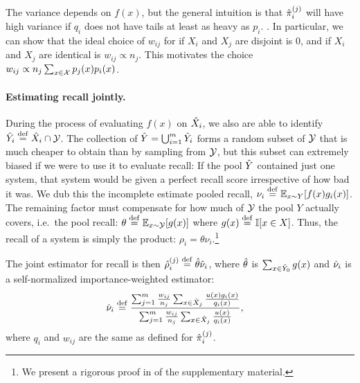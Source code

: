 The variance depends on $f(x)$, but the general intuition is that ${\hat{\pi}}_i^{(j)}$ will have high variance if 
$q_i$ does not have tails at least as heavy as $p_i$.
 .
In particular, we can show that the ideal choice  of $w_{ij}$ for if $X_i$ and $X_j$ are disjoint is $0$, and if $X_i$ and $X_j$ are identical is $w_{ij} \propto n_{j}$.
This motivates the choice $w_{ij} \propto n_{j} \sum_{x \in \mathcal{X}} p_j(x) p_i(x)$.

\paragraph{Estimating recall jointly.}
During the process of evaluating $f(x)$ on ${\hat{X}}_i$, we also are able to identify ${\hat{Y}}_i \stackrel{\rm def}{=} {\hat{X}}_i \cap \mathcal{Y}$.
The collection of ${\hat{Y}} = \bigcup_{i=1}^m {\hat{Y}}_i$ forms a random subset of $\mathcal{Y}$ that is much cheaper to obtain than by sampling from $\mathcal{Y}$, but this subset can extremely biased if we were to use it to evaluate recall: 
If the pool ${\hat{Y}}$ contained just one system, that system would be given a perfect recall score irrespective of how bad it was.
We dub this the incomplete estimate pooled recall, $\nu_i \stackrel{\rm def}{=} \mathbb{E}_{x \sim Y}[f(x) g_i(x)]$.
The remaining factor must compensate for how much of $\mathcal{Y}$ the pool $Y$ actually covers, i.e.\ the pool recall: $\theta \stackrel{\rm def}{=} \mathbb{E}_{x \sim \mathcal{Y}}[g(x)]$ where $g(x) \stackrel{\rm def}{=} \mathbb{I}[x \in X]$.
Thus, the recall of a system is simply the product: $\rho_i = \theta \nu_i$.\footnote{%
We present a rigorous proof in  of the supplementary material.}

The joint estimator for recall is then ${\hat{\rho}}_i^{(j)} \stackrel{\rm def}{=} {\hat{\theta}}{\hat{\nu}}_i$, where ${\hat{\theta}}$ is $\sum_{x \in {\hat{Y}}_0} g(x)$ and ${\hat{\nu}}_i$ is a self-normalized importance-weighted estimator:
\begin{align*}
  {\hat{\nu}}_i &\stackrel{\rm def}{=} \frac{\sum_{j=1}^m \frac{w_{ij}}{n_j} \sum_{x \in {\hat{X}}_j} \frac{u(x) g_i(x)}{q_i(x)}}{\sum_{j=1}^m \frac{w_{ij}}{n_j} \sum_{x \in {\hat{X}}_j} \frac{u(x)}{q_i(x)}},
\end{align*}
where $q_i$ and $w_{ij}$ are the same as defined for ${\hat{\pi}}_i^{(j)}$.

